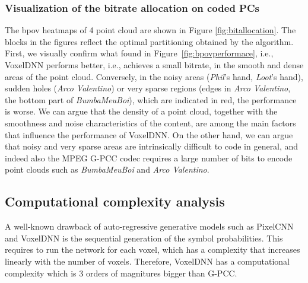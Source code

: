 \subsubsection{Visualization of the bitrate allocation on coded PCs} The bpov heatmaps of 4 point cloud are shown in Figure \ref{fig:bitallocation}. The blocks in the figures reflect the optimal partitioning obtained by the algorithm. 
First, we visually confirm what found in Figure~\ref{fig:bpovperformace}, i.e., VoxelDNN performs better, i.e., achieves a small bitrate, in the smooth and dense areas of the point cloud. Conversely, in the noisy areas  (\textit{Phil}'s hand, \textit{Loot}'s hand), sudden holes (\textit{Arco Valentino}) or very sparse regions (edges in \textit{Arco Valentino}, the bottom part of \textit{BumbaMeuBoi}), which are indicated in red, the performance is worse. 
We can argue that the density of a point cloud, together with the smoothness and noise characteristics of the content, are among the main factors that influence the performance of VoxelDNN. On the other hand, we can argue that noisy and very sparse areas are intrinsically difficult to code in general, and indeed also the MPEG G-PCC codec requires a large number of bits to encode point clouds such as \textit{BumbaMeuBoi} and \textit{Arco Valentino}.





\subsection{Computational complexity analysis} A well-known drawback of auto-regressive generative models such as PixelCNN and VoxelDNN is the sequential generation of the symbol probabilities. This requires to run the network for each voxel, which has a complexity that increases linearly with the number of voxels. Therefore, VoxelDNN has a computational complexity which is 3 orders of magnitures bigger than G-PCC.


